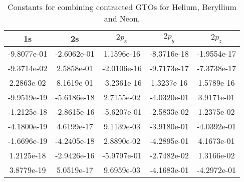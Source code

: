 \begin{table}
\begin{centering}
			\par
			\begin{subtable}{1.0\linewidth}
				\begin{centering}
				\begin{tabular}{|c|c|c|c|c|}
					\hline 
					1s & 2s & $2p_{x}$  & $2p_{y}$ & $2p_{z}$\tabularnewline
					\hline 
					-9.8077e-01 & -2.6062e-01 & 1.1596e-16 & -8.3716e-18 & -1.9554e-17\tabularnewline
					\hline 
					-9.3714e-02 & 2.5858e-01 & -2.0106e-16 & -9.7173e-17 & -7.3738e-17\tabularnewline
					\hline 
					2.2863e-02 & 8.1619e-01 & -3.2361e-16 & 1.3237e-16 & 1.5789e-16\tabularnewline
					\hline 
					-9.9519e-19  & -5.6186e-18 & 2.7155e-02 & -4.0320e-01 & 3.9171e-01\tabularnewline
					\hline 
					-1.2125e-18 & -2.8615e-16 & -5.6207e-01 & -2.5833e-02 & 1.2375e-02\tabularnewline
					\hline 
					-4.1800e-19 & 4.6199e-17 & 9.1139e-03 & -3.9180e-01 & -4.0392e-01\tabularnewline
					\hline 
					-1.6696e-19 & -4.2405e-18 & 2.8890e-02 & -4.2895e-01 & 4.1673e-01\tabularnewline
					\hline 
					1.2125e-18 & -2.9426e-16 & -5.9797e-01 & -2.7482e-02 & 1.3166e-02\tabularnewline
					\hline 
					3.8779e-19 & 5.0519e-17 & 9.6959e-03 & -4.1683e-01 & -4.2972e-01\tabularnewline
					\hline 
				\end{tabular}
				\par\end{centering}
			\end{subtable}

			
			\par

			\end{centering}
			\protect
			\caption{Constants for combining contracted GTOs for Helium, Beryllium and
			Neon.}
			\label{tab:He_Be_Ne_K}

		\end{table}

